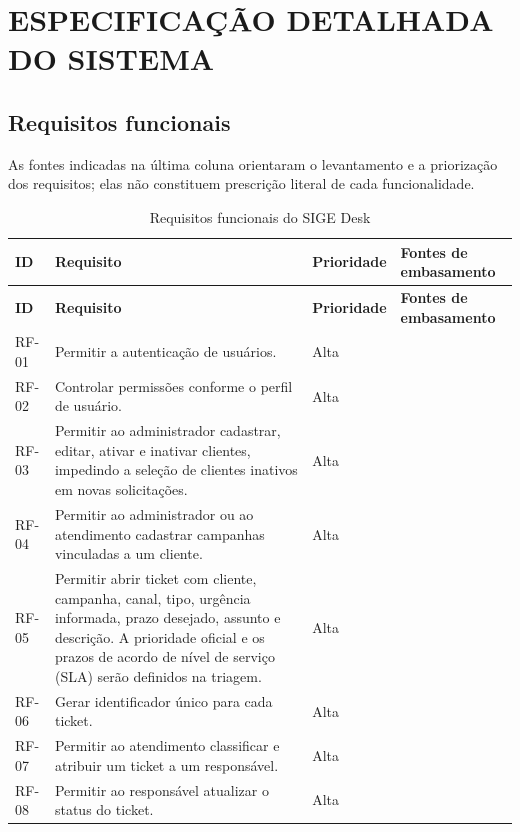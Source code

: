 \section{ESPECIFICAÇÃO DETALHADA DO SISTEMA}
\label{ap:especificacao}

\subsection{Requisitos funcionais}

As fontes indicadas na última coluna orientaram o levantamento e a priorização dos requisitos; elas não constituem prescrição literal de cada funcionalidade.

\begin{longtable}{p{}p{}p{}p{}}
\caption{Requisitos funcionais do SIGE Desk}\label{tab:requisitos-funcionais}\\
\hline
\textbf{ID} & \textbf{Requisito} & \textbf{Prioridade} & \textbf{Fontes de embasamento} \\
\hline
\endfirsthead
\hline
\textbf{ID} & \textbf{Requisito} & \textbf{Prioridade} & \textbf{Fontes de embasamento} \\
\hline
\endhead
RF-01 & Permitir a autenticação de usuários. & Alta & \cite{servicedesk2023,brasil2018} \\
RF-02 & Controlar permissões conforme o perfil de usuário. & Alta & \cite{servicedesk2023,brasil2018} \\
RF-03 & Permitir ao administrador cadastrar, editar, ativar e inativar clientes, impedindo a seleção de clientes inativos em novas solicitações. & Alta & \cite{kharisma2024,steponaitis2023} \\
RF-04 & Permitir ao administrador ou ao atendimento cadastrar campanhas vinculadas a um cliente. & Alta & \cite{younas2025,agus2019} \\
RF-05 & Permitir abrir ticket com cliente, campanha, canal, tipo, urgência informada, prazo desejado, assunto e descrição. A prioridade oficial e os prazos de acordo de nível de serviço (SLA) serão definidos na triagem. & Alta & \cite{servicerequest2020,servicedesk2023} \\
RF-06 & Gerar identificador único para cada ticket. & Alta & \cite{servicedesk2023,iso29148} \\
RF-07 & Permitir ao atendimento classificar e atribuir um ticket a um responsável. & Alta & \cite{servicedesk2023,steponaitis2023} \\
RF-08 & Permitir ao responsável atualizar o status do ticket. & Alta & \cite{servicerequest2020} \\

\end{longtable}
